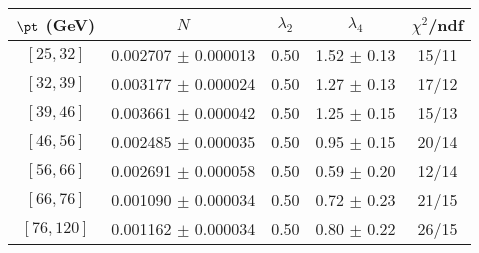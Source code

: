 \begin{tabular}{c||c|c|c|c}
$\pt$ (GeV) & $N$ & $\lambda_{2}$ & $\lambda_4$  & $\chi^2$/ndf  \\
\hline
$[25, 32]$ & 0.002707 $\pm$ 0.000013 & 0.50 & 1.52 $\pm$ 0.13 & 15/11\\
$[32, 39]$ & 0.003177 $\pm$ 0.000024 & 0.50 & 1.27 $\pm$ 0.13 & 17/12\\
$[39, 46]$ & 0.003661 $\pm$ 0.000042 & 0.50 & 1.25 $\pm$ 0.15 & 15/13\\
$[46, 56]$ & 0.002485 $\pm$ 0.000035 & 0.50 & 0.95 $\pm$ 0.15 & 20/14\\
$[56, 66]$ & 0.002691 $\pm$ 0.000058 & 0.50 & 0.59 $\pm$ 0.20 & 12/14\\
$[66, 76]$ & 0.001090 $\pm$ 0.000034 & 0.50 & 0.72 $\pm$ 0.23 & 21/15\\
$[76, 120]$ & 0.001162 $\pm$ 0.000034 & 0.50 & 0.80 $\pm$ 0.22 & 26/15\\
\end{tabular}
